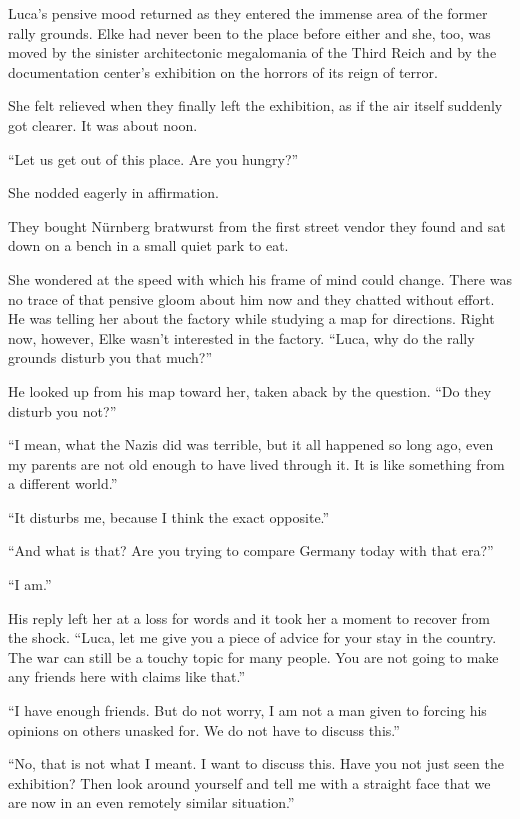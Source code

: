 \sectionline

Luca's pensive mood returned as they entered the immense area of the former rally grounds. Elke had never been to the place before either and she, too, was moved by the sinister architectonic megalomania of the Third Reich and by the documentation center's exhibition on the horrors of its reign of terror.

She felt relieved when they finally left the exhibition, as if the air itself suddenly got clearer. It was about noon.

``Let us get out of this place. Are you hungry?''

She nodded eagerly in affirmation.

\sectionline

They bought Nürnberg bratwurst from the first street vendor they found and sat down on a bench in a small quiet park to eat.

She wondered at the speed with which his frame of mind could change. There was no trace of that pensive gloom about him now and they chatted without effort. He was telling her about the factory while studying a map for directions. Right now, however, Elke wasn't interested in the factory. ``Luca, why do the rally grounds disturb you that much?''

He looked up from his map toward her, taken aback by the question. ``Do they disturb you not?''

``I mean, what the Nazis did was terrible, but it all happened so long ago, even my parents are not old enough to have lived through it. It is like something from a different world.''

``It disturbs me, because I think the exact opposite.''

``And what is that? Are you trying to compare Germany today with that era?''

``I am.''

His reply left her at a loss for words and it took her a moment to recover from the shock. ``Luca, let me give you a piece of advice for your stay in the country. The war can still be a touchy topic for many people. You are not going to make any friends here with claims like that.''

``I have enough friends. But do not worry, I am not a man given to forcing his opinions on others unasked for. We do not have to discuss this.''

``No, that is not what I meant. I want to discuss this. Have you not just seen the exhibition? Then look around yourself and tell me with a straight face that we are now in an even remotely similar situation.''

